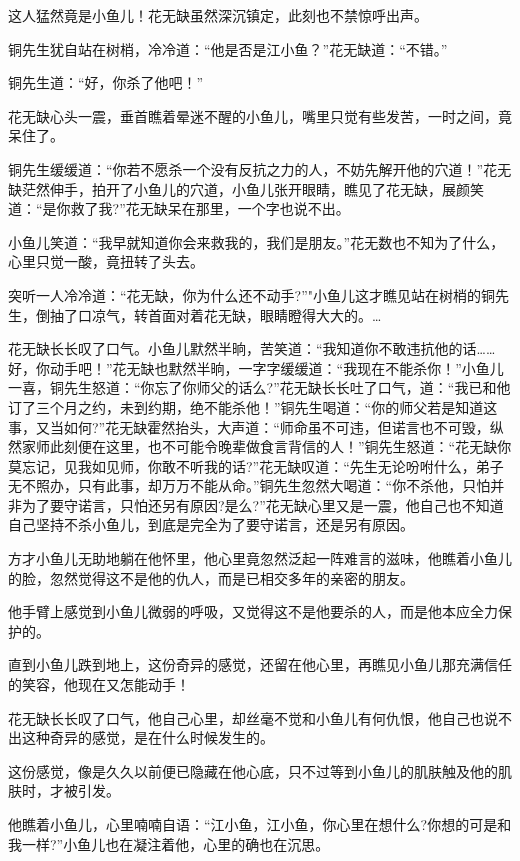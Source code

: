 \documentclass[12pt,oneside]{book}
\begin{document}
这人猛然竟是小鱼儿！花无缺虽然深沉镇定，此刻也不禁惊呼出声。

铜先生犹自站在树梢，冷冷道：``他是否是江小鱼？''花无缺道：``不错。''

铜先生道：``好，你杀了他吧！''

花无缺心头一震，垂首瞧着晕迷不醒的小鱼儿，嘴里只觉有些发苦，一时之间，竟呆住了。

铜先生缓缓道：``你若不愿杀一个没有反抗之力的人，不妨先解开他的穴道！''花无缺茫然伸手，拍开了小鱼儿的穴道，小鱼儿张开眼睛，瞧见了花无缺，展颜笑道：``是你救了我?''花无缺呆在那里，一个字也说不出。

小鱼儿笑道：``我早就知道你会来救我的，我们是朋友。''花无数也不知为了什么，心里只觉一酸，竟扭转了头去。

突听一人冷冷道：``花无缺，你为什么还不动手?''"小鱼儿这才瞧见站在树梢的铜先生，倒抽了口凉气，转首面对着花无缺，眼睛瞪得大大的。\ldots{}

花无缺长长叹了口气。小鱼儿默然半晌，苦笑道：``我知道你不敢违抗他的话\ldots\ldots 好，你动手吧！''花无缺也默然半晌，一字字缓缓道：``我现在不能杀你！''小鱼儿一喜，铜先生怒道：``你忘了你师父的话么?''花无缺长长吐了口气，道：``我已和他订了三个月之约，未到约期，绝不能杀他！''铜先生喝道：``你的师父若是知道这事，又当如何?''花无缺霍然抬头，大声道：``师命虽不可违，但诺言也不可毁，纵然家师此刻便在这里，也不可能令晚辈做食言背信的人！''铜先生怒道：``花无缺你莫忘记，见我如见师，你敢不听我的话?''花无缺叹道：``先生无论吩咐什么，弟子无不照办，只有此事，却万万不能从命。''铜先生忽然大喝道：``你不杀他，只怕并非为了要守诺言，只怕还另有原因?是么?''花无缺心里又是一震，他自己也不知道自己坚持不杀小鱼儿，到底是完全为了要守诺言，还是另有原因。

方才小鱼儿无助地躺在他怀里，他心里竟忽然泛起一阵难言的滋味，他瞧着小鱼儿的脸，忽然觉得这不是他的仇人，而是已相交多年的亲密的朋友。

他手臂上感觉到小鱼儿微弱的呼吸，又觉得这不是他要杀的人，而是他本应全力保护的。

直到小鱼儿跌到地上，这份奇异的感觉，还留在他心里，再瞧见小鱼儿那充满信任的笑容，他现在又怎能动手！

花无缺长长叹了口气，他自己心里，却丝毫不觉和小鱼儿有何仇恨，他自己也说不出这种奇异的感觉，是在什么时候发生的。

这份感觉，像是久久以前便已隐藏在他心底，只不过等到小鱼儿的肌肤触及他的肌肤时，才被引发。

他瞧着小鱼儿，心里喃喃自语：``江小鱼，江小鱼，你心里在想什么?你想的可是和我一样?''小鱼儿也在凝注着他，心里的确也在沉思。
\end{document}
